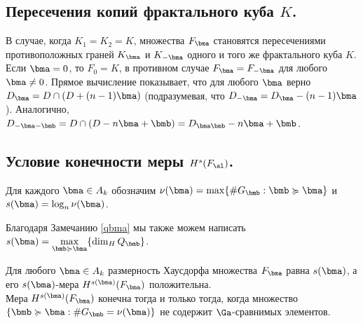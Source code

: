 \begin{example}
     
\end{example}

\subsection{Пересечения копий фрактального куба $K$.}

В случае, когда $K_1=K_2=K$, множества $F_\bma$ становятся пересечениями противоположных граней $K_\bma$ и $K_{-\bma}$ одного и того же фрактального куба $K$.
Если $\bma=0$, то $F_0=K$, в противном случае $F_\bma=F_{-\bma}$ для любого $\bma\neq 0$. 
Прямое вычисление показывает, что для любого $\bma$ верно $D_\bma=D\cap(D+(n-1)\bma)$ (подразумевая, что $D_{-\bma}=D_\bma-(n-1)\bma$).
Аналогично, $D_{-\bma-\bmb}=D\cap(D-n\bma+\bmb)=D_{\bma\bmb}-n\bma+\bmb$.


\subsection{Условие конечности меры $H^s(F_\al)$.}

\begin{definition}\label{nubma}
Для каждого $\bma\in A_k$ обозначим  $\nu(\bma)=\max\{\#G_\bmb : \bmb\succcurlyeq\bma\}$ и $s(\bma)=\log_n\nu(\bma)$.   
\end{definition}

Благодаря Замечанию \ref{qbma} мы также можем написать
$s(\bma)=\max\limits_{\bmb\succcurlyeq\bma}\{\dim_HQ_\bmb \}$.

\begin{theorem}\label{dimthm}
Для любого $\bma\in A_k$ размерность Хаусдорфа множества $F_\bma$ равна $s(\bma)$, а его $s(\bma)$-мера $H^{s(\bma)}(F_\bma)$ положительна.\\
Мера $H^{s(\bma)}(F_\bma)$ конечна тогда и только тогда, когда множество $\{\bmb\succcurlyeq\bma : \#G_\bmb=\nu(\bma)\}$ не содержит $\Ga$-сравнимых элементов.
\end{theorem}

